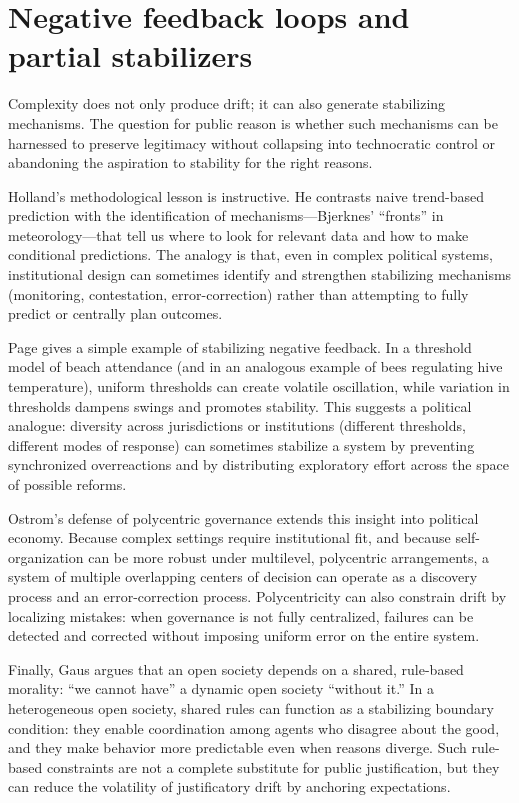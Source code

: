 \documentclass[12pt]{report}
\begin{document}
\section{Negative feedback loops and partial stabilizers}

Complexity does not only produce drift; it can also generate stabilizing mechanisms. The question for public reason is whether such mechanisms can be harnessed to preserve legitimacy without collapsing into technocratic control or abandoning the aspiration to stability for the right reasons.

Holland’s methodological lesson is instructive. He contrasts naive trend-based prediction with the identification of mechanisms---Bjerknes’ “fronts” in meteorology---that tell us where to look for relevant data and how to make conditional predictions. \parencite[p.~2]{holland2012signals} The analogy is that, even in complex political systems, institutional design can sometimes identify and strengthen stabilizing mechanisms (monitoring, contestation, error-correction) rather than attempting to fully predict or centrally plan outcomes.

Page gives a simple example of stabilizing negative feedback. In a threshold model of beach attendance (and in an analogous example of bees regulating hive temperature), uniform thresholds can create volatile oscillation, while variation in thresholds dampens swings and promotes stability. \parencite[p.~161]{page2011diversity} This suggests a political analogue: diversity across jurisdictions or institutions (different thresholds, different modes of response) can sometimes stabilize a system by preventing synchronized overreactions and by distributing exploratory effort across the space of possible reforms.

Ostrom’s defense of polycentric governance extends this insight into political economy. Because complex settings require institutional fit, and because self-organization can be more robust under multilevel, polycentric arrangements, a system of multiple overlapping centers of decision can operate as a discovery process and an error-correction process. \parencite[p.~642]{ostrom2010polycentric} Polycentricity can also constrain drift by localizing mistakes: when governance is not fully centralized, failures can be detected and corrected without imposing uniform error on the entire system.

Finally, Gaus argues that an open society depends on a shared, rule-based morality: “we cannot have” a dynamic open society “without it.” \parencite[p.~2]{gaus2016rulebased} In a heterogeneous open society, shared rules can function as a stabilizing boundary condition: they enable coordination among agents who disagree about the good, and they make behavior more predictable even when reasons diverge. \parencite[p.~3]{gaus2016rulebased} Such rule-based constraints are not a complete substitute for public justification, but they can reduce the volatility of justificatory drift by anchoring expectations.
\end{document}
